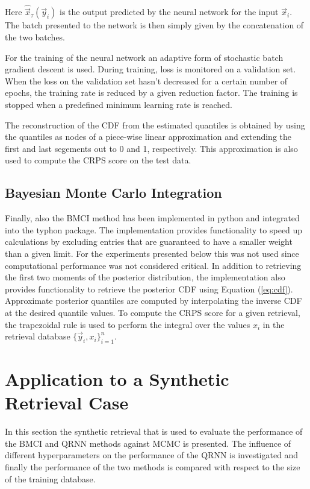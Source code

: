 \documentclass[journal abbreviation, manuscript]{copernicus}
\begin{document}
    Here $\hat{\vec{x}}_\tau(\vec{y}_i)$ is the output predicted by the neural
    network for the input $\vec{x}_i$. The batch presented to the network is
    then simply given by the concatenation of the two batches.

   For the training of the neural network an adaptive form of stochastic batch
   gradient descent is used. During training, loss is monitored on a validation
   set. When the loss on the validation set hasn't decreased for a certain number
   of epochs, the training rate is reduced by a given reduction factor. The
   training is stopped when a predefined minimum learning rate is reached.

   The reconstruction of the CDF from the estimated quantiles is obtained
   by using the quantiles as nodes of a piece-wise linear approximation and
   extending the first and last segements out to 0 and 1, respectively.
   This approximation is also used to compute the CRPS score on the test
   data.

\subsection{Bayesian Monte Carlo Integration}

  Finally, also the BMCI method has been implemented in python and integrated
  into the typhon package. The implementation provides functionality to speed up
  calculations by excluding entries that are guaranteed to have a smaller weight
  than a given limit. For the experiments presented below this was not used
  since computational performance was not considered critical. In addition to
  retrieving the first two moments of the posterior distribution, the
  implementation also provides functionality to retrieve the posterior CDF using
  Equation (\ref{eq:cdf}). Approximate posterior quantiles are computed by
  interpolating the inverse CDF at the desired quantile values. To compute the
  CRPS score for a given retrieval, the trapezoidal rule is used to perform the
  integral over the values $x_i$ in the retrieval database
  $\{\vec{y}_i, x_i\}_{i = 1}^n$.


\section{Application to a Synthetic Retrieval Case}
\label{sec:synthetic}

  In this section the synthetic retrieval that is used to evaluate the
  performance of the BMCI and QRNN methods against MCMC is presented. The
  influence of different hyperparameters on the performance of the QRNN is
  investigated and finally the performance of the two methods is compared with
  respect to the size of the training database.
\end{document}
